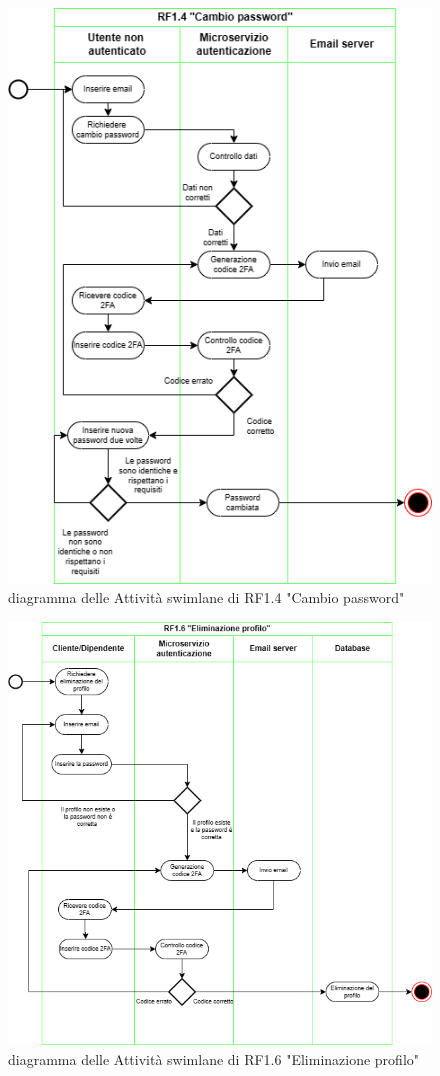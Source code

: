 \documentclass{report}
\begin{document}
\begin{figure}[H]
	\centering\includegraphics[width=1\textwidth]{images/password_change_swimlane.drawio.png}
	diagramma delle Attività swimlane di RF1.4 "Cambio password"
\end{figure}
\begin{figure}[H]
	\centering\includegraphics[width=1\textwidth]{images/eliminazione_profilo_swimlane.drawio.png}
	diagramma delle Attività swimlane di RF1.6 "Eliminazione profilo"
\end{figure}
\end{document}
